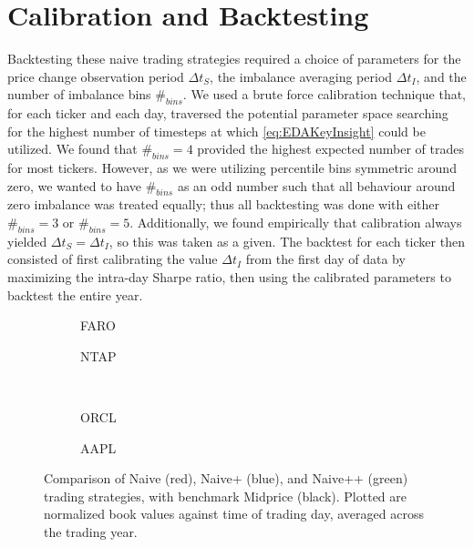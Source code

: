 \section{Calibration and Backtesting}
Backtesting these naive trading strategies required a choice of parameters for the price change observation period $\Delta t_S$, the imbalance averaging period $\Delta t_I$, and the number of imbalance bins $\#_{bins}$. We used a brute force calibration technique that, for each ticker and each day, traversed the potential parameter space searching for the highest number of timesteps at which \eqref{eq:EDAKeyInsight} could be utilized. We found that $\#_{bins} = 4$ provided the highest expected number of trades for most tickers. However, as we were utilizing percentile bins symmetric around zero, we wanted to have $\#_{bins}$ as an odd number such that all behaviour around zero imbalance was treated equally; thus all backtesting was done with either $\#_{bins} = 3$ or $\#_{bins} = 5$. Additionally, we found empirically that calibration always yielded $\Delta t_S = \Delta t_I$, so this was taken as a given. The backtest for each ticker then consisted of first calibrating the value $\Delta t_I$ from the first day of data by maximizing the intra-day Sharpe ratio, then using the calibrated parameters to backtest the entire year.

\begin{figure}
\centering
\begin{subfigure}{.35\linewidth}
  \centering
  \setlength\figureheight{\linewidth} 
  \setlength\figurewidth{\linewidth}
  
  \caption{FARO}
\end{subfigure}%
\hfil%
\begin{subfigure}{.35\linewidth}
  \centering
  \setlength\figureheight{\linewidth}
  \setlength\figurewidth{\linewidth}
   
  \caption{NTAP}
\end{subfigure}\\
\vspace{1cm}
\begin{subfigure}{.35\linewidth}
  \centering
  \setlength\figureheight{\linewidth} 
  \setlength\figurewidth{\linewidth}
  
  \caption{ORCL}
\end{subfigure}%
\hfil%
\begin{subfigure}{.35\linewidth}
  \centering
  \setlength\figureheight{\linewidth}
  \setlength\figurewidth{\linewidth}
   
  \caption{AAPL}
\end{subfigure}%
  \caption{Comparison of Naive (red), Naive+ (blue), and Naive++ (green) trading strategies, with benchmark Midprice (black). Plotted are normalized book values against time of trading day, averaged across the trading year.}
  \label{fig:comp}
\end{figure}

